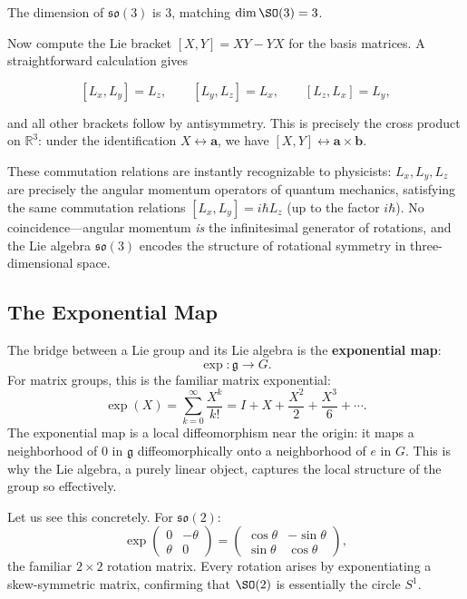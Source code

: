 The dimension of $\mathfrak{so}(3)$ is $3$, matching $\dim \SO(3) = 3$.

Now compute the Lie bracket $[X,Y] = XY - YX$ for the basis matrices. A straightforward calculation gives

\[
[L_x, L_y] = L_z,\qquad
[L_y, L_z] = L_x,\qquad
[L_z, L_x] = L_y,
\]

and all other brackets follow by antisymmetry. This is precisely the cross product on $\mathbb{R}^3$: under the identification $X \leftrightarrow \mathbf{a}$, we have $[X,Y] \leftrightarrow \mathbf{a} \times \mathbf{b}$.

These commutation relations are instantly recognizable to physicists: $L_x, L_y, L_z$ are precisely the angular momentum operators of quantum mechanics, satisfying the same commutation relations $[L_x, L_y] = i\hbar L_z$ (up to the factor $i\hbar$). No coincidence---angular momentum \emph{is} the infinitesimal generator of rotations, and the Lie algebra $\mathfrak{so}(3)$ encodes the structure of rotational symmetry in three-dimensional space.

\subsection{The Exponential Map}

The bridge between a Lie group and its Lie algebra is the \textbf{exponential map}:
\[
    \exp \colon \mathfrak{g} \to G.
\]
For matrix groups, this is the familiar matrix exponential:
\[
    \exp(X) = \sum_{k=0}^{\infty} \frac{X^k}{k!} = I + X + \frac{X^2}{2} + \frac{X^3}{6} + \cdots.
\]
The exponential map is a local diffeomorphism near the origin: it maps a neighborhood of $0$ in $\mathfrak{g}$ diffeomorphically onto a neighborhood of $e$ in $G$. This is why the Lie algebra, a purely linear object, captures the local structure of the group so effectively.

Let us see this concretely. For $\mathfrak{so}(2)$:
\[
\exp\!\begin{pmatrix} 0 & -\theta \\ \theta & 0 \end{pmatrix}
= \begin{pmatrix} \cos\theta & -\sin\theta \\ \sin\theta & \cos\theta \end{pmatrix},
\]
the familiar $2 \times 2$ rotation matrix. Every rotation arises by exponentiating a skew-symmetric matrix, confirming that $\SO(2)$ is essentially the circle $S^1$.

